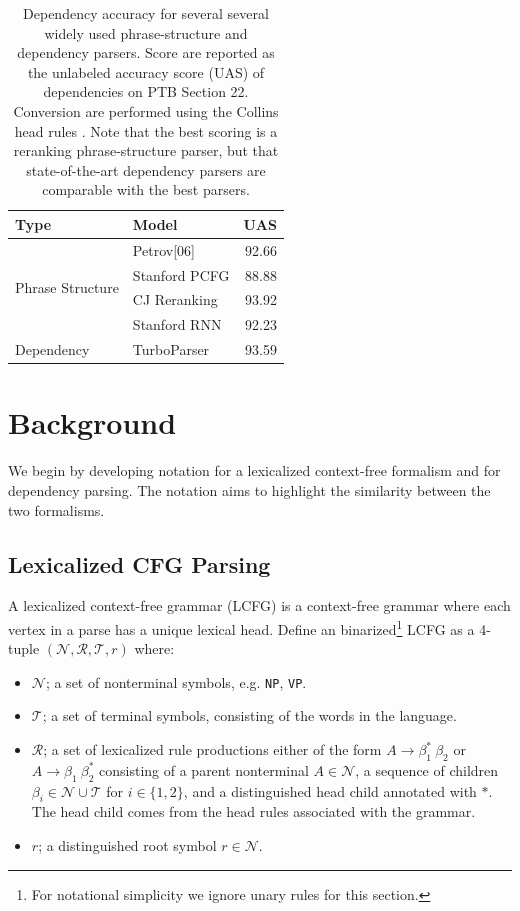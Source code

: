 \documentclass[11pt,letterpaper]{article}
\newcommand{\nonterms}{\mathcal{N}}
\newcommand{\rules}{\mathcal{R}}
\newcommand{\terms}{\mathcal{T}}
\newcommand{\Tag}[1]{\texttt{#1}}
\newcommand{\Root}{r}
\newcommand{\RuleA}[3]{#1 \rightarrow #2^*\ #3}
\newcommand{\RuleB}[3]{#1 \rightarrow #2\ #3^*}
\begin{document}
\begin{table}
  \centering
  \small
  \begin{tabular}{|l|l|r|}
    \hline
    Type & Model & UAS  \\
    \hline

    \hline
    \multirow{4}{*}{Phrase Structure} & Petrov[06] & 92.66   \\
    & Stanford PCFG & 88.88 \\
    & CJ Reranking & 93.92 \\
    & Stanford RNN & 92.23 \\
    \hline
    \multirow{1}{*}{Dependency} & TurboParser & 93.59  \\
    \hline
  \end{tabular}
  \caption{Dependency accuracy for several several widely used phrase-structure and dependency parsers.
    Score are reported as the unlabeled accuracy score (UAS) of dependencies on PTB  Section 22.
    Conversion are performed using the Collins head rules \cite{collins2003head}.
    Note that the best scoring is a reranking phrase-structure parser, but that state-of-the-art
    dependency parsers are comparable with the best parsers. }
  \label{fig:depcomp}
\end{table}




\section{Background}

We begin by developing notation for a lexicalized context-free formalism and for dependency parsing. The notation aims to highlight the similarity between the two formalisms.

\subsection{Lexicalized CFG Parsing}

A lexicalized context-free grammar (LCFG) is a context-free grammar where each vertex in a parse has a unique lexical head. Define an binarized\footnote{For notational simplicity we ignore unary rules for this section.} LCFG as a 4-tuple $(\nonterms, \rules, \terms, \Root)$ where:
\begin{itemize}
\item $\nonterms$; a set of nonterminal symbols, e.g. \Tag{NP}, \Tag{VP}.
\item $\terms$; a set of terminal symbols, consisting of the words in the language.
\item $\rules$; a set of lexicalized rule productions either of the form $\RuleA{A}{\beta_1}{\beta_2}$ or $\RuleB{A}{\beta_1}{\beta_2}$  consisting of a parent nonterminal $A \in \nonterms$, a sequence of children $\beta_i \in \nonterms \cup \terms$ for $i \in \{1, 2\}$, and a distinguished head child annotated with $*$. The head child comes from the head rules associated with the grammar.
\item $\Root$; a distinguished root symbol $\Root \in \nonterms$.
\end{itemize}
\end{document}
